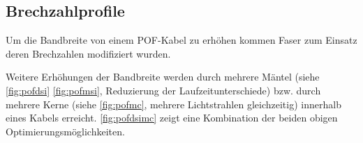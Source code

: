 \subsection{Brechzahlprofile}
\label{subsec:pofbrechzahlprofile}

Um die Bandbreite von einem POF-Kabel zu erhöhen kommen Faser zum Einsatz deren
Brechzahlen modifiziert wurden.




Weitere Erhöhungen der Bandbreite werden durch mehrere Mäntel (siehe
\autoref{fig:pofdsi} \autoref{fig:pofmsi}, Reduzierung der Laufzeitunterschiede)
bzw. durch mehrere Kerne (siehe \autoref{fig:pofmc}, mehrere Lichtstrahlen
gleichzeitig) innerhalb eines Kabels erreicht. \autoref{fig:pofdsimc} zeigt eine
Kombination der beiden obigen Optimierungsmöglichkeiten.
\cite{pofacprofile}

